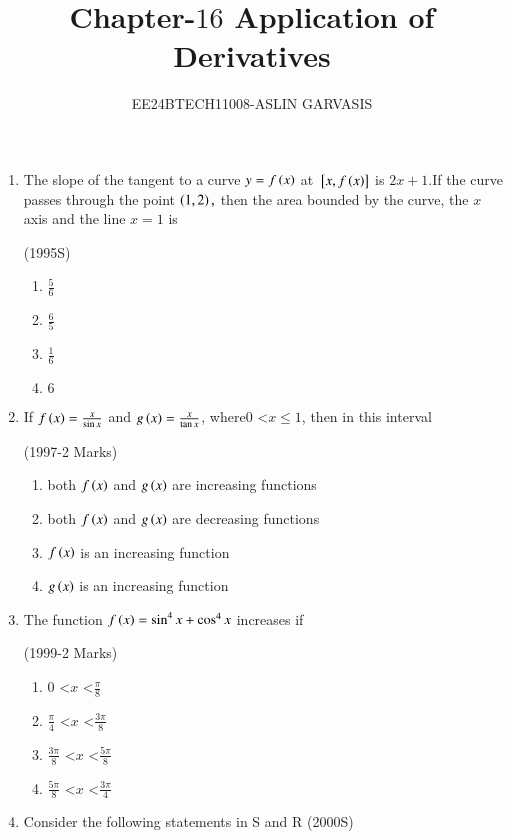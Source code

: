 \documentclass[journal,10pt,twocolumn]{IEEEtran}
\theoremstyle{remark}
\begin{document}

\vspace{3cm}
\title{Chapter-$16$ Application of Derivatives}
\author{EE24BTECH11008-ASLIN GARVASIS}
\maketitle
\begin{enumerate}[start=9]
\item The slope of the tangent to a curve $y=f\left(x\right)$ at ${}\left[x,f\left(x\right)\right]$ is $2x+1.$If the curve passes through the point $\left(1,2\right),$ then the area bounded by the curve, the $x$ axis and the line $x=1$ is

\hfill {(1995S)} \\

\begin{enumerate}
    \item $\frac{5}{6}$
    \item $\frac{6}{5}$
    \item $\frac{1}{6}$
    \item $6$
\end{enumerate}
\item If $f\left(x\right)=\frac{x}{\sin x}$ and $g\left(x\right)=\frac{x}{\tan x}$, where$0$ \textless $x \le 1$, then in this interval

\hfill {(1997-2 Marks)} \\

\begin{enumerate}
    \item both $f\left(x\right)$ and $g\left(x\right)$ are increasing functions
    \item both $f\left(x\right)$ and $g\left(x\right)$ are decreasing functions 
    \item $f\left(x\right)$ is an increasing function
    \item $g\left(x\right)$ is an increasing function 
\end{enumerate}
\item The function $f\left(x\right)=\sin^4x+\cos^4x$ increases if

\hfill {(1999-2 Marks)} \\

\begin{enumerate}
    \item $0$ \textless $x$ \textless $\frac{\pi}{8}$ 
    \item $\frac{\pi}{4}$ \textless $x$ \textless $\frac{3\pi}{8}$
    \item $\frac{3\pi}{8}$ \textless $x$ \textless $\frac{5\pi}{8}$
    \item $\frac{5\pi}{8}$ \textless $x$ \textless $\frac{3\pi}{4}$
\end{enumerate}
\item Consider the following statements in S and R \hfill{(2000S)}\\

\end{enumerate}
\end{document}
